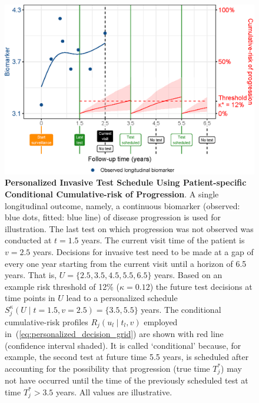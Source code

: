  \begin{figure}
\centerline{\includegraphics{images/schedule_explanation_102.eps}}
\caption{\textbf{Personalized Invasive Test Schedule Using Patient-specific Conditional Cumulative-risk of Progression}.  A single longitudinal outcome, namely, a continuous biomarker (observed: blue dots, fitted: blue line) of disease progression is used for illustration. The last test on which progression was not observed was conducted at $t=1.5$ years. The current visit time of the patient is $v=2.5$ years. Decisions for invasive test need to be made at a gap of every one year starting from the current visit until a horizon of 6.5 years. That is, $U=\{2.5, 3.5, 4.5, 5.5, 6.5\}$ years. Based on an example risk threshold of 12\% ($\kappa=0.12$) the future test decisions at time points in $U$ lead to a personalized schedule $S_j^{\kappa} (U \mid t=1.5, v=2.5) = \{3.5, 5.5\}$ years. The conditional cumulative-risk profiles $R_j(u_l \mid t_l, v)$ employed in~(\ref{eq:personalized_decision_grid}) are shown with red line (confidence interval shaded). It is called `conditional' because, for example, the second test at future time 5.5 years, is scheduled after accounting for the possibility that progression (true time $T^*_j$) may not have occurred until the time of the previously scheduled test at time $T^*_j>3.5$ years. All values are illustrative.} 
\label{fig:schedule_explanation}
\end{figure}


